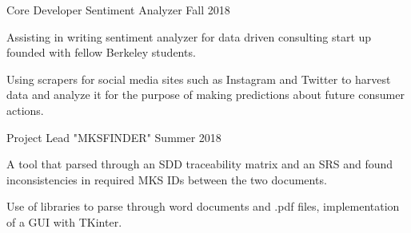 \documentclass[11pt, a4paper]{awesome-cv}
\begin{document}
\begin{cventries}

  \cventry
    {Core Developer}
    {Sentiment Analyzer} %
    {Fall 2018}
    {} %
    {
      \begin{cvitems} %
        \item {Assisting in writing sentiment analyzer for data driven consulting start up founded with fellow Berkeley students.}
        \item {Using scrapers for social media sites such as Instagram and Twitter to harvest data and analyze it for the purpose of making predictions about future consumer actions.}
      \end{cvitems}
    }

  \cventry
    {Project Lead}
    {"MKSFINDER"} %
    {Summer 2018}
    {} %
    {
      \begin{cvitems} %
        \item {A tool that parsed through an SDD traceability matrix and an SRS and found inconsistencies in required MKS IDs between the two documents.}
        \item {Use of libraries to parse through word documents and .pdf files, implementation of a GUI with TKinter.}
      \end{cvitems}
    }

\end{cventries}



\end{document}

